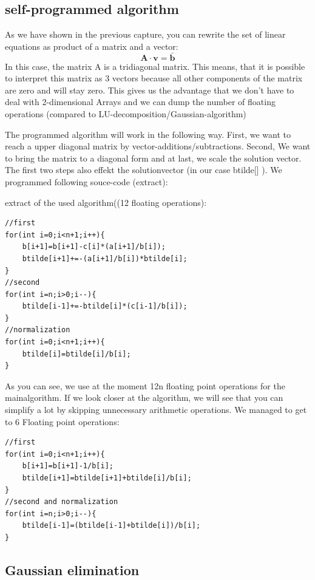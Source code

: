 \documentclass[10pt,a4paper]{article}
\begin{document}
\subsection{self-programmed algorithm }

As we have shown in the previous capture, you can rewrite the set of linear equations as product of a matrix and a vector:
\begin{equation}
	\mathbf{A \cdot v}=\bar{\mathbf{b}}
\end{equation}
In this case, the matrix A is a tridiagonal matrix. This means, that it is possible to interpret this matrix as 3 vectors because all other components of the matrix are zero and will stay zero. This gives us the advantage that we don't have to deal with 2-dimensional Arrays and we can dump the number of floating operations (compared to LU-decomposition/Gaussian-algorithm)

The programmed algorithm will work in the following way. First, we want to reach a upper diagonal matrix by vector-additions/subtractions. Second, We want to bring the matrix to a diagonal form and at last, we scale the solution vector. The first two steps also effekt the solutionvector (in our case btilde[] ). We programmed following souce-code (extract):

extract of the used algorithm((12 floating operations):
\begin{lstlisting}
//first
for(int i=0;i<n+1;i++){
	b[i+1]=b[i+1]-c[i]*(a[i+1]/b[i]);
	btilde[i+1]+=-(a[i+1]/b[i])*btilde[i];
}
//second
for(int i=n;i>0;i--){
	btilde[i-1]+=-btilde[i]*(c[i-1]/b[i]);
}
//normalization
for(int i=0;i<n+1;i++){
	btilde[i]=btilde[i]/b[i];
}
\end{lstlisting}
	
	
As you can see, we use at the moment 12n floating point operations for the mainalgorithm. If we look closer at the algorithm, we will see that you can simplify a lot by skipping unnecessary arithmetic operations. 
We managed to get to 6 Floating point operations:
\begin{lstlisting}
//first
for(int i=0;i<n+1;i++){
	b[i+1]=b[i+1]-1/b[i];
	btilde[i+1]=btilde[i+1]+btilde[i]/b[i];
}
//second and normalization
for(int i=n;i>0;i--){
	btilde[i-1]=(btilde[i-1]+btilde[i])/b[i];	
}
\end{lstlisting}
	
\subsection{Gaussian elimination}
\end{document}
